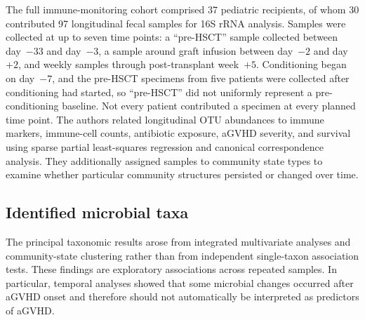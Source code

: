 \documentclass[11pt,a4paper]{article}
\begin{document}
The full immune-monitoring cohort comprised 37 pediatric recipients, of whom 30 contributed 97 longitudinal fecal samples for 16S rRNA analysis. Samples were collected at up to seven time points: a ``pre-HSCT'' sample collected between day~$-33$ and day~$-3$, a sample around graft infusion between day~$-2$ and day~$+2$, and weekly samples through post-transplant week~$+5$. Conditioning began on day~$-7$, and the pre-HSCT specimens from five patients were collected after conditioning had started, so ``pre-HSCT'' did not uniformly represent a pre-conditioning baseline. Not every patient contributed a specimen at every planned time point. The authors related longitudinal OTU abundances to immune markers, immune-cell counts, antibiotic exposure, aGVHD severity, and survival using sparse partial least-squares regression and canonical correspondence analysis. They additionally assigned samples to community state types to examine whether particular community structures persisted or changed over time.
\par

\subsection{Identified microbial taxa}

The principal taxonomic results arose from integrated multivariate analyses and community-state clustering rather than from independent single-taxon association tests. These findings are exploratory associations across repeated samples. In particular, temporal analyses showed that some microbial changes occurred after aGVHD onset and therefore should not automatically be interpreted as predictors of aGVHD.
\end{document}
